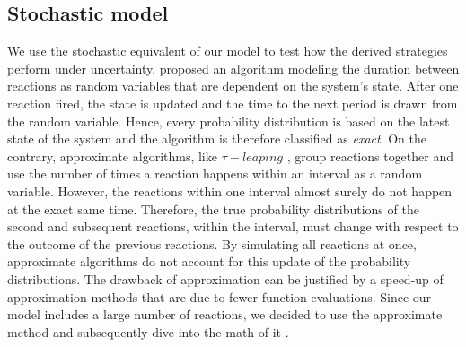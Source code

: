 \subsection{Stochastic model}
\label{sec:stochastic}
We use the stochastic equivalent of our model to test how the derived strategies perform under uncertainty. \cite{Gillespie.1977} proposed an algorithm modeling the duration between reactions as random variables that are dependent on the system's state. After one reaction fired, the state is updated and the time to the next period is drawn from the random variable. Hence, every probability distribution is based on the latest state of the system and the algorithm is therefore classified as \textit{exact}.  
On the contrary, approximate algorithms, like $\tau-leaping$ \citep{Gillespie.2001}, group reactions together and use the number of times a reaction happens within an interval as a random variable. However, the reactions within one interval almost surely do not happen at the exact same time. Therefore, the true probability distributions of the second and subsequent reactions, within the interval, must change with respect to the outcome of the previous reactions. By simulating all reactions at once, approximate algorithms do not account for this update of the probability distributions. 
The drawback of approximation can be justified by a speed-up of approximation methods that are due to fewer function evaluations. Since our model includes a large number of reactions, we decided to use the approximate method and subsequently dive into the math of it \citep{Gillespie.2001}.\\


